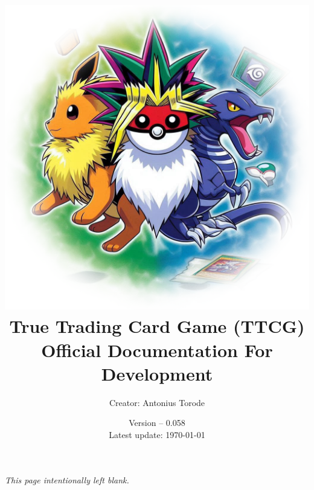 \documentclass[openany,a4paper,10pt]{book}
\title{\vspace{0.1cm}  \includegraphics[scale=0.5]{./images/man_cover.png} \vspace{.5cm} \\ True Trading Card Game (TTCG) \\ Official Documentation For Development}
\author{Creator: Antonius Torode}
\date{Version -- 0.058 \\ Latest update: \today}
\begin{document}
\frontmatter
\maketitle

\tableofcontents
\newpage
\vspace*{\fill}
\begin{center}
	\textit{This page intentionally left blank.}
\end{center}
\vspace*{\fill}

\mainmatter
\pagestyle{fancy}
\fancyhf{}
\fancyhead[RO, LE]{\thepage}










\backmatter

%
\printindex
\end{document}
